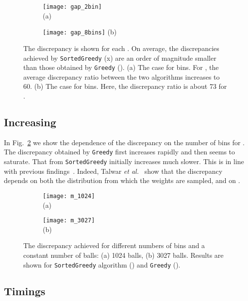 \documentclass[12pt,psfig,a4]{article}
\newcommand{\sg}{\texttt{SortedGreedy}}
\newcommand{\gr}{\texttt{Greedy}}
\theoremstyle{plain}
\begin{document}
\begin{figure}
\centering
	\begin{subfigure}[b]{0.49\textwidth}	
	      	\texttt{[image: gap\_2bin]} \\
		\centering (a) 
	\end{subfigure} 
	\begin{subfigure}[b]{0.49\textwidth}	
	      	\texttt{[image: gap\_8bins]} 
		\centering (b) 
	\end{subfigure} 
	\caption{The discrepancy is shown for each .  On average, the discrepancies achieved by \sg{} (x) are an order of magnitude smaller than those obtained by \gr{} (). (a) The case for  bins. For , the average discrepancy ratio between the two algorithms increases to 60. (b) The case for  bins. Here, the discrepancy ratio is about 73 for .}
	\label{fig:gaps}
\end{figure}

\subsection{Increasing }

 In Fig.~\ref{fig:gaps_bins} we show the dependence of the discrepancy on the number of bins  for . The discrepancy obtained by \gr{} first increases rapidly and then seems to saturate. That from \sg{} initially increases much slower. This is in line with previous findings~\cite{talwar2007balanced}. Indeed, Talwar \textit{et al.}~\cite{talwar2007balanced} show that the discrepancy depends on both the distribution from which the weights are sampled, and on .


\begin{figure}
\centering
	\begin{subfigure}[b]{0.49\textwidth}	
	      	\texttt{[image: m\_1024]} \\
		\centering (a) 
	\end{subfigure} 
	\begin{subfigure}[b]{0.49\textwidth}	
	      	\texttt{[image: m\_3027]} \\
		\centering (b) 
	\end{subfigure} 
	\caption{The discrepancy achieved for different numbers of bins and a constant number of balls: (a) 1024 balls, (b) 3027 balls. Results are shown for \sg{} algorithm () and \gr{} ().} 
	\label{fig:gaps_bins}
\end{figure}


\subsection{Timings}
\end{document}
